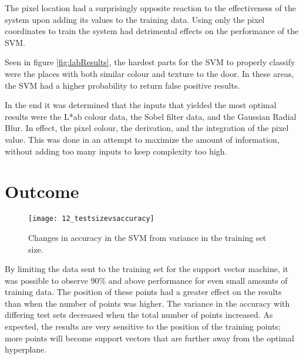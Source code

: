 The pixel location had a surprisingly opposite reaction to the effectiveness of the system upon adding its values to the training data. Using only the pixel coordinates to train the system had detrimental effects on the performance of the SVM. 

Seen in figure \ref{fig:labResults}, the hardest parts for the SVM to properly classify were the places with both similar colour and texture to the door. In these areas, the SVM had a higher probability to return false positive results.

In the end it was determined that the inputs that yielded the most optimal results were the L*ab colour data, the Sobel filter data, and the Gaussian Radial Blur. In effect, the pixel colour, the derivation, and the integration of the pixel value. This was done in an attempt to maximize the amount of information, without adding too many inputs to keep complexity too high.

\newpage

\section{Outcome}

\begin{figure}[ht]
    \centering
    \texttt{[image: 12\_testsizevsaccuracy]}
    \caption{Changes in accuracy in the SVM from variance in the training set size.}
    \label{fig:12_testsizevsaccuracy}
\end{figure}

By limiting the data sent to the training set for the support vector machine, it was possible to observe 90\% and above performance for even small amounts of training data. The position of these points had a greater effect on the results than when the number of points was higher. The variance in the accuracy with differing test sets decreased when the total number of points increased. As expected, the results are very sensitive to the position of the training points; more points will become support vectors that are further away from the optimal hyperplane.







